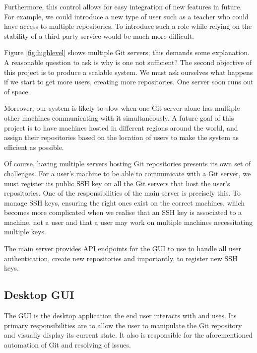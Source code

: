 Furthermore, this control allows for easy integration of new features in future. For example, we could introduce a new type of user such as a teacher who could have access to multiple repositories. To introduce such a role while relying on the stability of a third party service would be much more difficult.

Figure \ref{fig:highlevel} shows multiple Git servers; this demands some explanation. A reasonable question to ask is why is one not sufficient? The second objective of this project is to produce a scalable system. We must ask ourselves what happens if we start to get more users, creating more repositories. One server soon runs out of space. 

Moreover, our system is likely to slow when one Git server alone has multiple other machines communicating with it simultaneously. A future goal of this project is to have machines hosted in different regions around the world, and assign their repositories based on the location of users to make the system as efficient as possible.

Of course, having multiple servers hosting Git repositories presents its own set of challenges. For a user's machine to be able to communicate with a Git server, we must register its public SSH key on all the Git servers that host the user's repositories. One of the responsibilities of the main server is precisely this. To manage SSH keys, ensuring the right ones exist on the correct machines, which becomes more complicated when we realise that an SSH key is associated to a machine, not a user and that a user may work on multiple machines necessitating multiple keys.

The main server provides API endpoints for the GUI to use to handle all user authentication, create new repositories and importantly, to register new SSH keys.

\subsection{Desktop GUI}

The GUI is the desktop application the end user interacts with and uses. Its primary responsibilities are to allow the user to manipulate the Git repository and visually display its current state. It also is responsible for the aforementioned automation of Git and resolving of issues.

